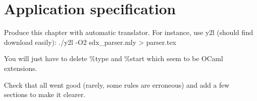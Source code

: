 \chapter{Application specification}
Produce this chapter with automatic translator. For instance, use y2l
(should find download easily):
./y2l -O2 sdx\_parser.mly > parser.tex

You will just have to delete \%type and \%start which seem to be OCaml
extensions.

Check that all went good (rarely, some rules are erroneous) and add a
few sections to make it clearer.

